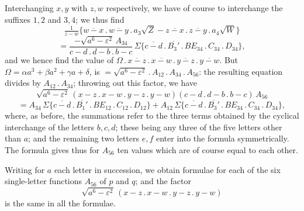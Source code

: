 \documentclass[11pt]{article}
\begin{document}
Interchanging $x,y$ with $z,w$ respectively, we have of course to interchange the suffixes $1,2$ and $3,4$; we thus find
\[
\tfrac{1}{z-w}\bigl\{\overline{w-x}\mathbin{.}\overline{w-y}\mathbin{.}a_3 \sqrt{Z} - \overline{z-x}\mathbin{.}\overline{z-y}\mathbin{.}a_4 \sqrt{W}\bigr\}
\]
\[
= \frac{-\sqrt{a^6-\varepsilon^2}\, A_{34}}{c-d\mathbin{.}d-b\mathbin{.}b-c}\,\Sigma\bigl\{\overline{c-d}\mathbin{.}\overline{B_3'}\mathbin{.}BE_{34}\mathbin{.}C_{34}\mathbin{.}D_{34}\bigr\},
\]
and we hence find the value of $\Omega\mathbin{.}\overline{x-z}\mathbin{.}\overline{x-w}\mathbin{.}\overline{y-z}\mathbin{.}\overline{y-w}$. But $\Omega = \alpha a^3 + \beta a^2 + \gamma a + \delta$, is $= \sqrt{a^6 - \varepsilon^2}\mathbin{.}A_{12}\mathbin{.}A_{34}\mathbin{.}A_{56}$: the resulting equation divides by $A_{12}\mathbin{.}A_{34}$; throwing out this factor, we have
\[
\sqrt{a^6 - \varepsilon^2}\,(x-z\mathbin{.}x-w\mathbin{.}y-z\mathbin{.}y-w)(c-d\mathbin{.}d-b\mathbin{.}b-c)\, A_{56}
\]
\[
= A_{34}\,\Sigma\bigl\{\overline{c-d}\mathbin{.}\overline{B_1'}\mathbin{.}BE_{12}\mathbin{.}C_{12}\mathbin{.}D_{12}\bigr\} + A_{12}\,\Sigma\bigl\{\overline{c-d}\mathbin{.}\overline{B_3'}\mathbin{.}BE_{34}\mathbin{.}C_{34}\mathbin{.}D_{34}\bigr\},
\]
where, as before, the summations refer to the three terms obtained by the cyclical interchange of the letters $b,c,d$; these being any three of the five letters other than $a$; and the remaining two letters $e,f$ enter into the formula symmetrically. The formula gives thus for $A_{56}$ ten values which are of course equal to each other.

\bigskip

Writing for $a$ each letter in succession, we obtain formulae for each of the six single-letter functions $A_{56}$ of $p$ and $q$; and the factor
\[
\sqrt{a^6 - \varepsilon^2}\,(x-z\mathbin{.}x-w\mathbin{.}y-z\mathbin{.}y-w)
\]
is the same in all the formulae.
\end{document}

